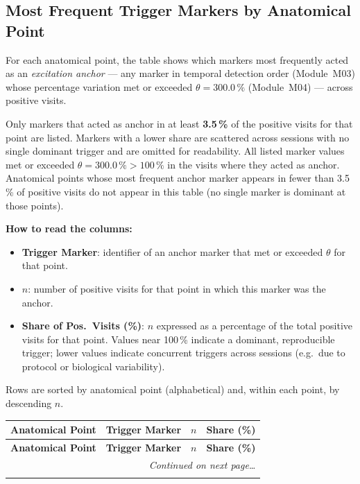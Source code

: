 \documentclass[a4paper,11pt]{article}
\begin{document}
\subsection{Most Frequent Trigger Markers by Anatomical Point}

For each anatomical point, the table shows which markers most frequently acted as an
\emph{excitation anchor} --- any marker in temporal detection order (Module~M03)
whose percentage variation met or exceeded $\theta = 300.0\,\%$
(Module~M04) --- across positive visits.

\medskip
Only markers that acted as anchor in at least \textbf{3.5\,\%}
of the positive visits for that point are listed.
Markers with a lower share are scattered across sessions with no single dominant trigger
and are omitted for readability.
All listed marker values met or exceeded $\theta = 300.0\,\% > 100\,\%$ in the
visits where they acted as anchor.
Anatomical points whose most frequent anchor marker appears in fewer than
3.5\,\% of positive visits do not appear in this table (no single
marker is dominant at those points).

\medskip
\noindent\textbf{How to read the columns:}
\begin{itemize}
  \item \textbf{Trigger Marker}: identifier of an anchor marker that met or exceeded $\theta$
        for that point.
  \item \textbf{$n$}: number of positive visits for that point in which this marker was
        the anchor.
  \item \textbf{Share of Pos.\ Visits (\%)}: $n$ expressed as a percentage of the total
        positive visits for that point.
        Values near 100\,\% indicate a dominant, reproducible trigger;
        lower values indicate concurrent triggers across sessions (e.g.\ due to
        protocol or biological variability).
\end{itemize}

\medskip
\noindent Rows are sorted by anatomical point (alphabetical) and, within each point, by
descending $n$.

\begin{footnotesize}
\begin{longtable}{p{3.5cm}p{7.5cm}rr}
\toprule
\textbf{Anatomical Point} &
\textbf{Trigger Marker} &
\textbf{$n$} &
\textbf{Share (\%)} \\
\midrule
\endfirsthead
\toprule
\textbf{Anatomical Point} &
\textbf{Trigger Marker} &
\textbf{$n$} &
\textbf{Share (\%)} \\
\midrule
\endhead
\midrule
\multicolumn{4}{r}{\footnotesize\emph{Continued on next page\ldots}} \\
\endfoot
\bottomrule
\endlastfoot

\end{longtable}
\end{footnotesize}
\end{document}
